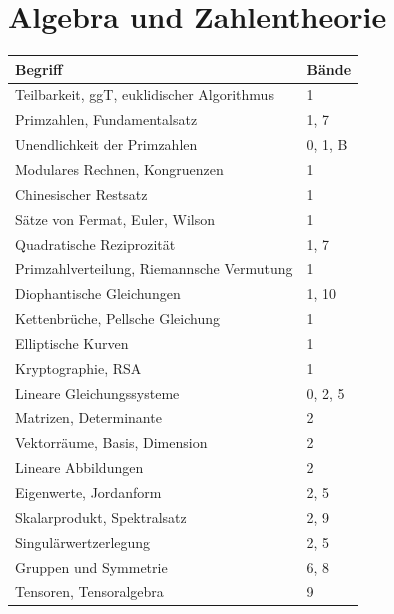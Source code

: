 \section*{Algebra und Zahlentheorie}
\nopagebreak
{\small\renewcommand{\arraystretch}{1.32}
\begin{longtable}{@{}P{5.6cm}P{2.8cm}@{}}
\toprule
\textbf{Begriff} & \textbf{Bände}\\
\midrule
\endhead
Teilbarkeit, ggT, euklidischer Algorithmus & 1\\
Primzahlen, Fundamentalsatz & 1, 7\\
Unendlichkeit der Primzahlen & 0, 1, B\\
Modulares Rechnen, Kongruenzen & 1\\
Chinesischer Restsatz & 1\\
Sätze von Fermat, Euler, Wilson & 1\\
Quadratische Reziprozität & 1, 7\\
Primzahlverteilung, Riemannsche Vermutung & 1\\
Diophantische Gleichungen & 1, 10\\
Kettenbrüche, Pellsche Gleichung & 1\\
Elliptische Kurven & 1\\
Kryptographie, RSA & 1\\
Lineare Gleichungssysteme & 0, 2, 5\\
Matrizen, Determinante & 2\\
Vektorräume, Basis, Dimension & 2\\
Lineare Abbildungen & 2\\
Eigenwerte, Jordanform & 2, 5\\
Skalarprodukt, Spektralsatz & 2, 9\\
Singulärwertzerlegung & 2, 5\\
Gruppen und Symmetrie & 6, 8\\
Tensoren, Tensoralgebra & 9\\
\bottomrule
\end{longtable}}

